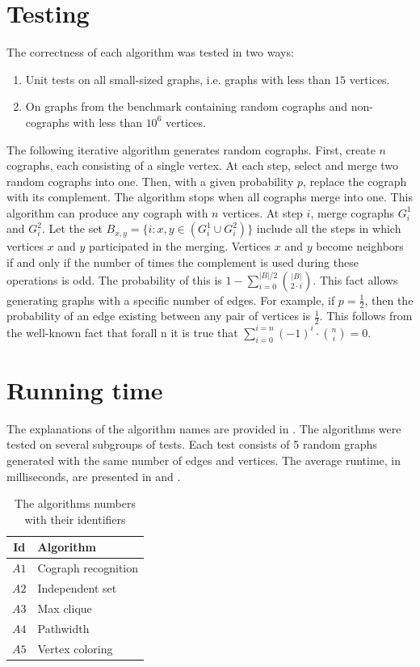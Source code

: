\section{Testing}
The correctness of each algorithm was tested in two ways:
\begin{enumerate}
    \item Unit tests on all small-sized graphs, i.e.  graphs with less than $15$ vertices. 
    \item On graphs from the benchmark containing random cographs and non-cographs with less than $10^6$ vertices.
\end{enumerate}

The following iterative algorithm generates random cographs. First, create $n$ cographs, each consisting of a single vertex. At each step, select and merge two random cographs into one. Then, with a given probability $p$, replace the cograph with its complement. The algorithm stops when all cographs merge into one. This algorithm can produce any cograph with $n$ vertices. At step $i$, merge cographs $G_i^1$ and $G_i^2$. 
Let the set $B_{x,y}=\{i \colon x,y \in (G_i^1 \cup G_i^2)\}$ include all the steps in which vertices $x$ and $y$ participated in the merging. Vertices $x$ and $y$ become neighbors if and only if the number of times the complement is used during these operations is odd. The probability of this is $1-\sum\limits_{i=0}^{|B|/2} \binom{|B|}{2 \cdot i}$. This fact allows generating graphs with a specific number of edges. For example, if $p=\frac{1}{2}$, then the probability of an edge existing between any pair of vertices is $\frac{1}{2}$. This follows from the well-known fact that forall n it is true that $\sum\limits_{i=0}^{i=n} {(-1)}^i \cdot \binom{n}{i}=0$.

\section{Running time}

The explanations of the algorithm names are provided in .
The algorithms were tested on several subgroups of tests. 
Each test consists of 5 random graphs generated with the same number of edges and vertices. The average runtime, in milliseconds, are presented in  and . 



\begin{table}[]
    \centering
    \begin{tabular}{ | c | p{4cm} |}
  \hline
  Id & Algorithm \\ [0.5ex] 
  \hline\hline
  $A1$ &  Cograph recognition \\
  \hline
  $A2$ &  Independent set  \\
  \hline
  $A3$ &  Max clique \\
  \hline
  $A4$ &  Pathwidth \\
  \hline
  $A5$ &  Vertex coloring \\
  \hline
  \end{tabular}
  \caption{The algorithms numbers with their identifiers}
    \label{tab:algorithms_number}
\end{table}

